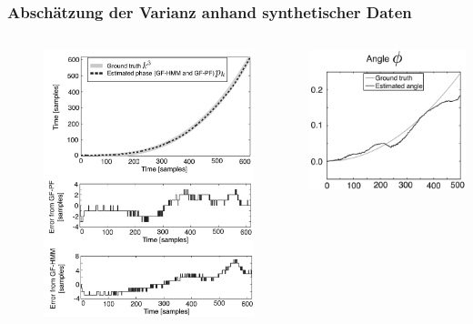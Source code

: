 \documentclass{beamer}
\begin{document}
\begin{frame}\frametitle{Abschätzung der Varianz anhand synthetischer Daten}
\begin{columns}
\begin{column}{.5\textwidth}
\begin{figure}
\centering
\includegraphics[width=\linewidth]{../Bilder/Fig6}
\label{fig:Fig6}
\end{figure}
\end{column}
\begin{column}{.25\textwidth}
\includegraphics[width=\linewidth]{../Bilder/Fig8a}\\

\end{column}
\end{columns}
\end{frame}
\end{document}
